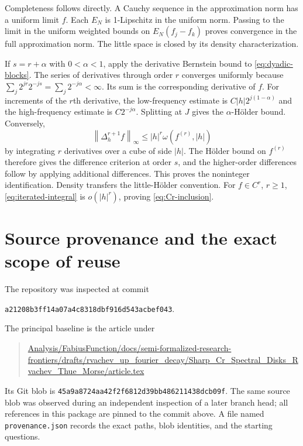 \documentclass[11pt,a4paper]{article}
\numberwithin{equation}{section}
\theoremstyle{definition}
\theoremstyle{remark}
\newcommand{\norm}[1]{\left\lVert#1\right\rVert}
\begin{document}
Completeness follows directly. A Cauchy sequence in the approximation
norm has a uniform limit $f$. Each $E_N$ is 1-Lipschitz in the uniform
norm. Passing to the limit in the uniform weighted bounds on
$E_N(f_j-f_k)$ proves convergence in the full approximation norm.
The little space is closed by its density characterization.

If $s=r+\alpha$ with $0<\alpha<1$, apply the derivative Bernstein
bound to \eqref{eq:dyadic-blocks}. The series of derivatives through
order $r$ converges uniformly because
$\sum_j2^{jr}2^{-js}=\sum_j2^{-j\alpha}<\infty$.
Its sum is the corresponding derivative of $f$. For increments of
the $r$th derivative, the low-frequency estimate is
$C|h|2^{j(1-\alpha)}$ and the high-frequency estimate is
$C2^{-j\alpha}$. Splitting at $J$ gives the $\alpha$-H\"older
bound. Conversely,
\begin{equation}
 \norm{\Delta_h^{r+1}f}_\infty
 \le |h|^r\omega(f^{(r)},|h|)
 \label{eq:iterated-integral}
\end{equation}
by integrating $r$ derivatives over a cube of side $|h|$.
The H\"older bound on $f^{(r)}$ therefore gives the difference
criterion at order $s$, and the higher-order differences follow by
applying additional differences. This proves the noninteger
identification. Density transfers the little-H\"older convention.
For $f\in C^r$, $r\ge1$, \eqref{eq:iterated-integral} is
$o(|h|^r)$, proving \eqref{eq:Cr-inclusion}.

\section{Source provenance and the exact scope of reuse}
\label{app:provenance}

The repository was inspected at commit
\begin{center}
\texttt{a21208b3ff14a07a4c8318dbf916d543acbef043}.
\end{center}
The principal baseline is the article under
\begin{quote}\small\url{Analysis/FabiusFunction/docs/semi-formalized-research-frontiers/drafts/rvachev_up_fourier_decay/Sharp_Cr_Spectral_Disks_Rvachev_Thue_Morse/article.tex}\end{quote}
Its Git blob is
\texttt{45a9a8724aa42f2f6812d39bb486211438dcb09f}.
The same source blob was observed during an independent inspection of
a later branch head; all references in this package are pinned to the
commit above. A file named \texttt{provenance.json} records the exact
paths, blob identities, and the starting questions.
\end{document}
